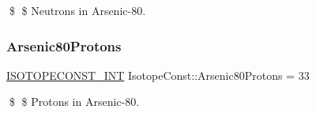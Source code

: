\$ \$ Neutrons in Arsenic-\/80. \mbox{\label{group___isotope_const-_arsenic-_as80_ga5af0d168188d17b567b26ae875facb59}} 
\subsubsection{\texorpdfstring{Arsenic80\+Protons}{Arsenic80Protons}}
{\footnotesize\ttfamily \mbox{\hyperlink{group___isotope_const-_macros_ga5f18360b3e99483a35c32d789e62621c}{I\+S\+O\+T\+O\+P\+E\+C\+O\+N\+S\+T\+\_\+\+I\+NT}} Isotope\+Const\+::\+Arsenic80\+Protons = 33}

\$ \$ Protons in Arsenic-\/80. 